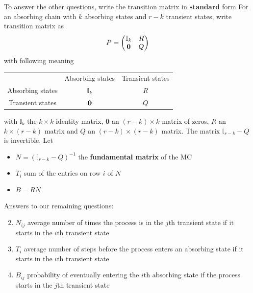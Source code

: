 \documentclass[aspectratio=169]{beamer}\usepackage[]{graphicx}\usepackage[]{xcolor}
\begin{document}
\begin{frame}
To answer the other questions, write the transition matrix in \textbf{standard} form
\vfill
For an absorbing chain with $k$ absorbing states and $r-k$ transient states, write transition matrix as
\[
P=\begin{pmatrix}
\mathbb{I}_k & R \\
\b0 & Q
\end{pmatrix}
\]
with following meaning
\begin{center}\footnotesize
\begin{tabular}{ccc}
& Absorbing states & Transient states \\
Absorbing states & $\mathbb{I}_k$ & $R$ \\
Transient states & $\b0$ & $Q$
\end{tabular}
\end{center}
with $\mathbb{I}_k$ the $k\times k$ identity matrix, $\mathbf{0}$ an $(r-k)\times k$ matrix of zeros, $R$ an $k\times (r-k)$ matrix and $Q$ an $(r-k)\times(r-k)$ matrix.
The matrix $\mathbb{I}_{r-k}-Q$ is invertible. Let
\begin{itemize}
\item $N=(\mathbb{I}_{r-k}-Q)^{-1}$ the \textbf{fundamental matrix} of the MC
\item $T_i$ sum of the entries on row $i$ of $N$
\item $B=RN$
\end{itemize}
\end{frame}

\begin{frame}
Answers to our remaining questions:
\vfill
\begin{enumerate}
\setcounter{enumi}{1}
\item $N_{ij}$ average number of times the process is in the $j$th transient state if it starts in the $i$th transient state
\vfill
\item $T_i$ average number of steps before the process enters an absorbing state if it starts in the $i$th transient state
\vfill
\item $B_{ij}$ probability of eventually entering the $i$th absorbing state if the process starts in the $j$th transient state
\end{enumerate}
\vfill
\end{frame}
\end{document}

